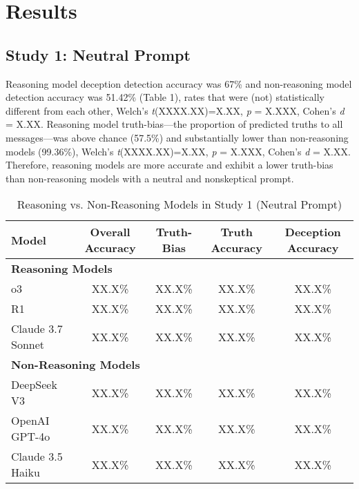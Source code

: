 \documentclass{article}
\begin{document}
\section{Results}

\subsection{Study 1: Neutral Prompt}

Reasoning model deception detection accuracy was 67\% and non-reasoning model detection accuracy was 51.42\% (Table 1), rates that were (not) statistically different from each other, Welch's \textit{t}(XXXX.XX)=X.XX, \textit{p} = X.XXX, Cohen's \textit{d} = X.XX. Reasoning model truth-bias---the proportion of predicted truths to all messages---was above chance (57.5\%) and substantially lower than non-reasoning models (99.36\%), Welch's \textit{t}(XXXX.XX)=X.XX, \textit{p} = X.XXX, Cohen's \textit{d} = X.XX. Therefore, reasoning models are more accurate and exhibit a lower truth-bias than non-reasoning models with a neutral and nonskeptical prompt.

\begin{table}[ht]
\centering
\caption{Reasoning vs. Non-Reasoning Models in Study 1 (Neutral Prompt)}
\begin{tabular}{lcccc}
\toprule
\textbf{Model} & \textbf{Overall Accuracy} & \textbf{Truth-Bias} & \textbf{Truth Accuracy} & \textbf{Deception Accuracy} \\
\midrule
\multicolumn{5}{l}{\textbf{Reasoning Models}} \\
o3 & XX.X\% & XX.X\% & XX.X\% & XX.X\% \\
R1 & XX.X\% & XX.X\% & XX.X\% & XX.X\% \\
Claude 3.7 Sonnet & XX.X\% & XX.X\% & XX.X\% & XX.X\% \\
\midrule
\multicolumn{5}{l}{\textbf{Non-Reasoning Models}} \\
DeepSeek V3 & XX.X\% & XX.X\% & XX.X\% & XX.X\% \\
OpenAI GPT-4o & XX.X\% & XX.X\% & XX.X\% & XX.X\% \\
Claude 3.5 Haiku & XX.X\% & XX.X\% & XX.X\% & XX.X\% \\
\bottomrule
\end{tabular}
\label{tab:study1_model_comparison}
\end{table}
\end{document}

